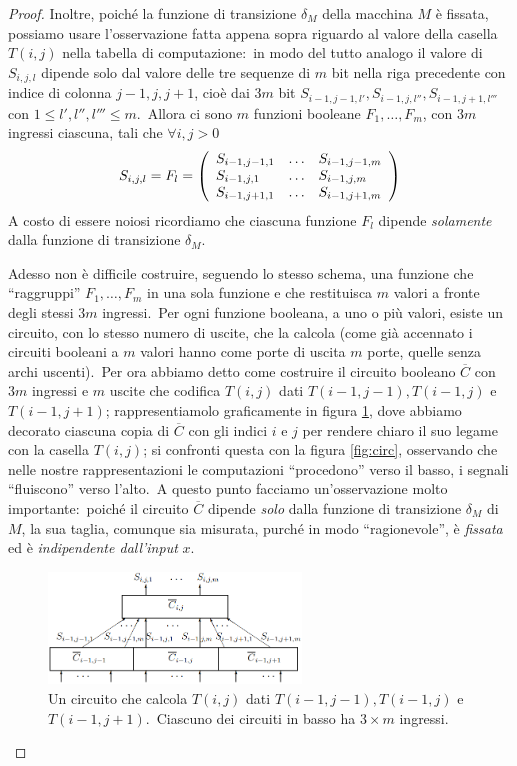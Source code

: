 \begin{proof}
    Inoltre, poiché la funzione di transizione $\delta_M$ della macchina $M$ è fissata, possiamo usare l'osservazione fatta appena sopra riguardo al valore della casella $T(i,j)$ nella tabella di computazione:\ in modo del tutto analogo il valore di $S_{i,j,l}$ dipende solo dal valore delle tre sequenze di $m$ bit nella riga precedente con indice di colonna $j-1, j ,j+1$, cioè dai $3m$ bit $S_{i-1,j-1, l'}, S_{i-1,j,l''}, S_{i-1,j+1,l'''}$ con $1 \leq l', l'', l''' \leq m$.\
    Allora ci sono $m$ funzioni booleane $F_1, \dots, F_m$, con $3m$ ingressi ciascuna, tali che $\forall i,j >0$
    \[S_{i,j,l} = F_l = \left(
        \begin{array}{l l l}
                S_{i-1, j-1,1} & \dots & S_{i-1, j-1,m} \\
                S_{i-1, j,1}   & \dots & S_{i-1, j,m}   \\
                S_{i-1, j+1,1} & \dots & S_{i-1, j+1,m} \\
            \end{array}\right)\]
    A costo di essere noiosi ricordiamo che ciascuna funzione $F_l$ dipende \textit{solamente} dalla funzione di transizione $\delta_M$.\

    Adesso non è difficile costruire, seguendo lo stesso schema, una funzione che ``raggruppi'' $F_1,\dots,F_m$ in una sola funzione e che restituisca $m$ valori a fronte degli stessi $3m$ ingressi.\
    Per ogni funzione booleana, a uno o più valori, esiste un circuito, con lo stesso numero di uscite, che la calcola (come già accennato i circuiti booleani a $m$ valori hanno come porte di uscita $m$ porte, quelle senza archi uscenti).\
    Per ora abbiamo detto come costruire il circuito booleano $\overline{C}$ con $3m$ ingressi e $m$ uscite che codifica $T(i,j)$ dati $T(i-1,j-1), T(i-1,j)$ e $T(i-1,j+1)$; rappresentiamolo graficamente in figura \ref{fig:circ-dim}, dove abbiamo decorato ciascuna copia di $\overline{C}$ con gli indici $i$ e $j$ per rendere chiaro il suo legame con la casella $T(i,j)$; si confronti questa con la figura \ref{fig:circ}, osservando che nelle nostre rappresentazioni le computazioni ``procedono'' verso il basso, i segnali ``fluiscono'' verso l'alto.\
    A questo punto facciamo un'osservazione molto importante:\ poiché il circuito $\overline{C}$ dipende \textit{solo} dalla funzione di transizione $\delta_M$ di $M$, la sua taglia, comunque sia misurata, purché in modo ``ragionevole'', è \textit{fissata} ed è \textit{indipendente dall'input} $x$.
    \begin{figure}[H]
        \centering
        \includegraphics[width=0.6\textwidth]{images/circuitValue.PNG}
        \caption{Un circuito che calcola $T(i,j)$ dati $T(i-1,j-1), T(i-1,j)$ e $T(i-1,j+1)$.\ Ciascuno dei circuiti in basso ha $3\times m$ ingressi.}
        \label{fig:circ-dim}
    \end{figure}


\end{proof}
